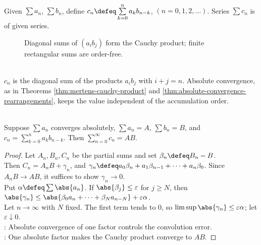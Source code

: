\begin{definition} \label{def:cauchy-product-of-series} \\
Given $\sum a_n$, $\sum b_n$, define $c_n\defeq\sum\limits_{k=0}^{n}a_kb_{n-k}$, $(n=0,1,2,\ldots)$. Series $\sum c_n$ is  of given series.
\end{definition}

\begin{figure}[H]
  \centering
  
  \caption{Diagonal sums of $(a_i b_j)$ form the Cauchy product; finite rectangular sums are order-free.}
  \label{fig:cauchy-product-diagonals}
\end{figure}

\begin{perspective} \label{per:cauchy-product-diagonal-ordering} \\
$c_n$ is the diagonal sum of the products $a_i b_j$ with $i+j=n$. Absolute convergence, as in Theorems \ref{thm:mertens-cauchy-product} and \ref{thm:absolute-convergence-rearrangements}, keeps the value independent of the accumulation order.
\end{perspective}

\begin{theorem} \label{thm:mertens-cauchy-product} \\
Suppose $\sum a_n$ converges absolutely, $\sum a_n=A$, $\sum b_n=B$, and $c_n=\sum\limits_{k=0}^{n}a_kb_{n-k}$. Then $\sum\limits_{n=0}^{\infty}c_n=AB$.
\begin{proof}
Let $A_n,B_n,C_n$ be the partial sums and set $\beta_n\defeq B_n-B$.\\
Then $C_n=A_nB+\gamma_n$, and $\gamma_n\defeq a_0\beta_n+a_1\beta_{n-1}+\cdots+a_n\beta_0$. Since $A_nB\to AB$, it suffices to show $\gamma_n\to0$.\\
Put $\alpha\defeq\sum\abs{a_n}$. If $\abs{\beta_j}\leq\varepsilon$ for $j\geq N$, then $\abs{\gamma_n}\leq \abs{\beta_0a_n+\cdots+\beta_Na_{n-N}}+\varepsilon\alpha$.\\
Let $n\to\infty$ with $N$ fixed. The first term tends to $0$, so $\limsup\abs{\gamma_n}\leq\varepsilon\alpha$; let $\varepsilon\downarrow0$.\\
: Absolute convergence of one factor controls the convolution error.\\
: One absolute factor makes the Cauchy product converge to $AB$.
\end{proof}
\end{theorem}

